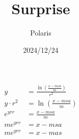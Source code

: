 \documentclass{article}
\title{Surprise}
\author{Polaris}
\date{2024/12/24}
\begin{document}
\maketitle

\[
    \begin{split}
        y &= \frac{\ln(\frac{x-msa}{m})}{r^2} \\
        y \cdot r^2 &= \ln(\frac{x-msa}{m}) \\
        e^{yrr} &= \frac{x-msa}{m} \\
        me^{yrr} &= x-msa \\
        me^{yrr} &= x-mas
    \end{split}
\]
\end{document}
